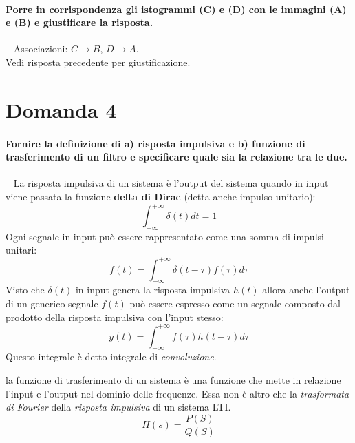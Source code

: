 \documentclass[a4paper,oneside]{scrbook}
\begin{document}
\paragraph{Porre in corrispondenza gli istogrammi (C) e (D) con le immagini (A) e (B) e giustificare la risposta.}\
\newline
Associazioni: $C \rightarrow B$, $D \rightarrow A$.\\
Vedi risposta precedente per giustificazione.

\section*{Domanda 4}
\paragraph{Fornire la definizione di a) risposta impulsiva e b) funzione di trasferimento di un filtro e specificare quale sia la relazione tra le due.}\
\newline
La risposta impulsiva di un sistema è l'output del sistema quando in input viene passata la funzione \textbf{delta di Dirac} (detta anche impulso unitario):
\begin{equation*}
	\int_{-\infty}^{+\infty} \delta(t)dt=1
\end{equation*}
Ogni segnale in input può essere rappresentato come una somma di impulsi unitari:
\begin{equation*}
	f(t)=\int_{-\infty}^{+\infty} \delta(t-\tau)f(\tau)d\tau
\end{equation*}
Visto che $\delta(t)$ in input genera la risposta impulsiva $h(t)$ allora anche l'output di un generico segnale $f(t)$ può essere espresso come un segnale
composto dal prodotto della risposta impulsiva con l'input stesso:
\begin{equation*}
	y(t)=\int_{-\infty}^{+\infty}f(\tau)h(t-\tau)d\tau
\end{equation*}
Questo integrale è detto integrale di \textit{convoluzione}.

la funzione di trasferimento di un sistema è una funzione che mette in relazione l'input e l'output nel dominio delle frequenze. Essa non è altro che la
\textit{trasformata di Fourier} della \textit{risposta impulsiva} di un sistema LTI.
\begin{equation*}
	H(s)=\frac{P(S)}{Q(S)}
\end{equation*}
\end{document}
